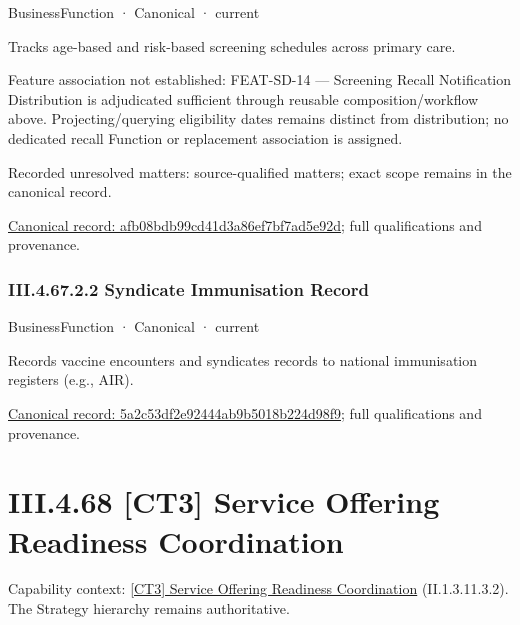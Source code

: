 \label{element:afb08bdb99cd41d3a86ef7bf7ad5e92d}
{\small BusinessFunction · Canonical · current}\par

Tracks age-based and risk-based screening schedules across primary care.



Feature association not established: FEAT-SD-14 — Screening Recall Notification Distribution is adjudicated sufficient through reusable composition/workflow above. Projecting/querying eligibility dates remains distinct from distribution; no dedicated recall Function or replacement association is assigned.


{\small Recorded unresolved matters: source-qualified matters; exact scope remains in the canonical record.}\par
{\footnotesize \href{../../../../continuum/business/business-function/afb08bdb99cd41d3a86ef7bf7ad5e92d.md}{Canonical record: afb08bdb99cd41d3a86ef7bf7ad5e92d}; full qualifications and provenance.}\par
\subsubsection*{III.4.67.2.2 Syndicate Immunisation Record}
\label{navigation:III.4.67.2.2}

\label{element:5a2c53df2e92444ab9b5018b224d98f9}
{\small BusinessFunction · Canonical · current}\par

Records vaccine encounters and syndicates records to national immunisation registers (e.g., AIR).


{\footnotesize \href{../../../../continuum/business/business-function/5a2c53df2e92444ab9b5018b224d98f9.md}{Canonical record: 5a2c53df2e92444ab9b5018b224d98f9}; full qualifications and provenance.}\par
\section*{III.4.68 [CT3] Service Offering Readiness Coordination}
\label{navigation:III.4.68}

{\small Capability context: \hyperref[element:0caecaba5d3e4781b8671b12c13ee283]{[CT3] Service Offering Readiness Coordination} (II.1.3.11.3.2). The Strategy hierarchy remains authoritative.}\par
